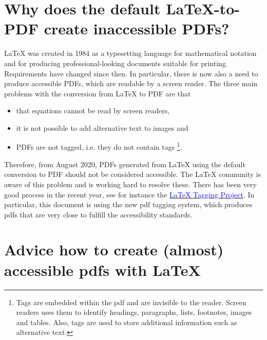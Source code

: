 \section{Why does the default LaTeX-to-PDF create inaccessible PDFs?}
%
\LaTeX{} was created in 1984 as a typesetting language for mathematical notation and for producing professional-looking documents suitable for printing. 
Requirements have changed since then. 
In particular, there is now also a need to produce accessible PDFs, which are readable by a screen reader.
%
The three main problems with the conversion from \LaTeX{} to PDF are that 
\begin{itemize}
	\item that equations cannot be read by screen readers,
	\item it is not possible to add alternative text to images and
	\item PDFs are not tagged, i.e. they do not contain tags 
	\footnote{Tags are embedded within the pdf and are invisible to the reader. Screen readers uses them to identify headings, paragraphs, lists, footnotes, images and tables. Also, tags are used to store additional information such as alternative text.}. 
\end{itemize}
Therefore, from August 2020, PDFs generated from \LaTeX{} using the default conversion to PDF should not be considered accessible.
The \LaTeX{} community is aware of this problem and is working hard to resolve these.
There has been very good process in the recent year, see for instance the
\href{https://latex3.github.io/tagging-project/}{\textcolor{blue}{LaTeX Tagging Project}}.
In particular, this document is using the new pdf tagging system, which produces pdfs that are very close to fulfill the accessibility standards. 

\section{Advice how to create (almost) accessible pdfs with \LaTeX}
\label{sec:advice-how-to-create-almost-accessible-documents-with-latex}

